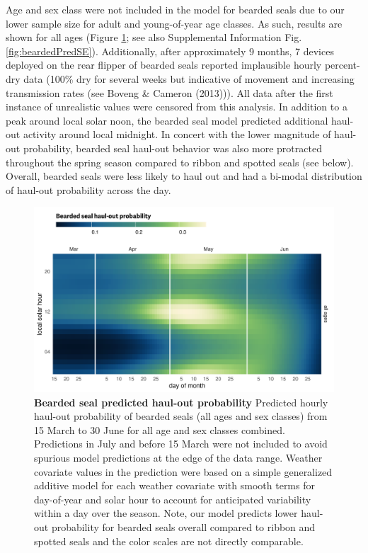 \documentclass[fleqn,10pt,lineno]{wlpeerj} %
\begin{document}
Age and sex class were not included in the model for bearded seals due to our
lower sample size for adult and young-of-year age classes. As such, results are
shown for all ages (Figure \ref{fig:beardedHOCal}; see also Supplemental Information Fig.
\ref{fig:beardedPredSE}). Additionally, after approximately 9 months, 7 devices
deployed on the rear flipper of bearded seals reported implausible hourly
percent-dry data (100\% dry for several weeks but indicative of movement and
increasing transmission rates (see Boveng \& Cameron (2013))). All data after the first
instance of unrealistic values were censored from this analysis. In addition to
a peak around local solar noon, the bearded seal model predicted additional
haul-out activity around local midnight. In concert with the lower magnitude of
haul-out probability, bearded seal haul-out behavior was also more protracted
throughout the spring season compared to ribbon
and spotted seals (see below). Overall, bearded seals were
less likely to haul out and had a bi-modal distribution of haul-out probability
across the day.



\begin{figure}
\includegraphics[width=1\linewidth]{../figures/Figure-005} \caption{\textbf{Bearded seal predicted haul-out probability} \linebreak Predicted hourly haul-out probability of bearded seals (all ages and sex classes) from 15 March to 30 June for all age and sex classes combined. Predictions in July and before 15 March were not included to avoid spurious model predictions at the edge of the data range. Weather covariate values in the prediction were based on a simple generalized additive model for each weather covariate with smooth terms for day-of-year and solar hour to account for anticipated variability within a day over the season. Note, our model predicts lower haul-out probability for bearded seals overall compared to ribbon and spotted seals and the color scales are not directly comparable.}\label{fig:beardedHOCal}
\end{figure}
\end{document}
